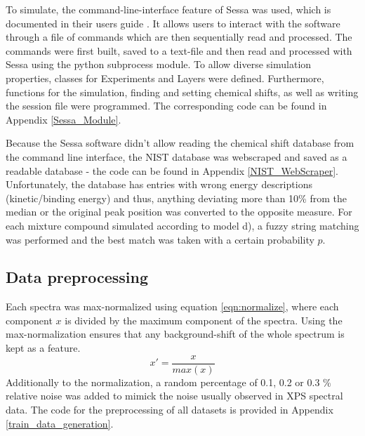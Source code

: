 To simulate, the command-line-interface feature of Sessa was used, which is documented in their users guide \cite{werner_simulation_2021}. It allows users to interact with the software through a file of commands which are then sequentially read and processed. The commands were first built, saved to a text-file and then read and processed with Sessa using the python subprocess module. To allow diverse simulation properties, classes for Experiments and Layers were defined. Furthermore, functions for the simulation, finding and setting chemical shifts, as well as writing the session file were programmed. The corresponding code can be found in Appendix \ref{Sessa_Module}.

Because the Sessa software didn't allow reading the chemical shift database from the command line interface, the NIST database was webscraped and saved as a readable database - the code can be found in Appendix \ref{NIST_WebScraper}. Unfortunately, the database has entries with wrong energy descriptions (kinetic/binding energy) and thus, anything deviating more than 10\% from the median or the original peak position was converted to the opposite measure.
For each mixture compound simulated according to model d), a fuzzy string matching was performed and the best match was taken with a certain probability $p$.



\subsection{Data preprocessing}

Each spectra was max-normalized using equation \ref{eqn:normalize}, where each component $x$ is divided by the maximum component of the spectra. Using the max-normalization ensures that any background-shift of the whole spectrum is kept as a feature.
\begin{equation}
    x' = \frac{x}{max(x)}
\label{eqn:normalize}
\end{equation}
Additionally to the normalization, a random percentage of 0.1, 0.2 or 0.3 \% relative noise was added to mimick the noise usually observed in XPS spectral data. The code for the preprocessing of all datasets is provided in Appendix \ref{train_data_generation}.